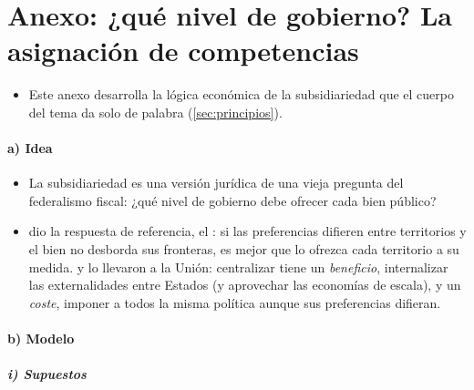\documentclass[11pt]{article}
\begin{document}
\section{Anexo: ¿qué nivel de gobierno?\cortetitulo{} La asignación de competencias}\label{anexo:asignacion}

\begin{itemize}
\item Este anexo desarrolla la lógica económica de la subsidiariedad que el cuerpo del tema da solo de palabra (\ref{sec:principios}).
\end{itemize}

\paragraph{a) Idea}

\begin{itemize}
\item La subsidiariedad es una versión jurídica de una vieja pregunta del federalismo fiscal: ¿qué nivel de gobierno debe ofrecer cada bien público? 
\item \textcite{Oates1972Fiscal} dio la respuesta de referencia, el : si las preferencias difieren entre territorios y el bien no desborda sus fronteras, es mejor que lo ofrezca cada territorio a su medida. \textcite{AlesinaAngeloniEtro2005} y \textcite{Tabellini2003Principles} lo llevaron a la Unión: centralizar tiene un \emph{beneficio}, internalizar las externalidades entre Estados (y aprovechar las economías de escala), y un \emph{coste}, imponer a todos la misma política aunque sus preferencias difieran.
\end{itemize}

\paragraph{b) Modelo}

\subparagraph{i) Supuestos}
\end{document}
